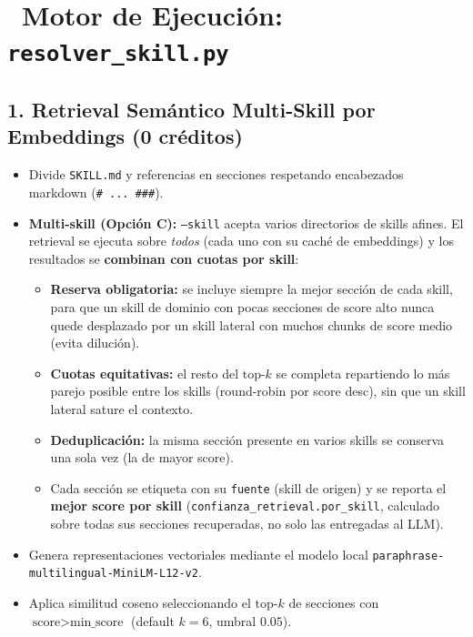 \documentclass[11pt,a4paper]{article}
\newcommand{\iconotexto}[2]{\textcolor{cyanNeon}{\faIcon{#1}}~#2}
\begin{document}
\section[Motor de Ejecución resolver\_skill.py]{\iconotexto{cogs}{Motor de Ejecución: \texttt{resolver\_skill.py}}}

\subsection{1. Retrieval Semántico Multi-Skill por Embeddings (0 créditos)}
\begin{itemize}[leftmargin=*]
  \item Divide \texttt{SKILL.md} y referencias en secciones respetando encabezados markdown (\texttt{\# ... \#\#\#}).
  \item \textbf{Multi-skill (Opción C):} \texttt{--skill} acepta varios directorios de skills afines. El retrieval se ejecuta sobre \emph{todos} (cada uno con su caché de embeddings) y los resultados se \textbf{combinan con cuotas por skill}:
  \begin{itemize}[leftmargin=*]
    \item \textbf{Reserva obligatoria:} se incluye siempre la mejor sección de cada skill, para que un skill de dominio con pocas secciones de score alto nunca quede desplazado por un skill lateral con muchos chunks de score medio (evita dilución).
    \item \textbf{Cuotas equitativas:} el resto del $\text{top-}k$ se completa repartiendo lo más parejo posible entre los skills (round-robin por score desc), sin que un skill lateral sature el contexto.
    \item \textbf{Deduplicación:} la misma sección presente en varios skills se conserva una sola vez (la de mayor score).
    \item Cada sección se etiqueta con su \texttt{fuente} (skill de origen) y se reporta el \textbf{mejor score por skill} (\texttt{confianza\_retrieval.por\_skill}, calculado sobre todas sus secciones recuperadas, no solo las entregadas al LLM).
  \end{itemize}
  \item Genera representaciones vectoriales mediante el modelo local \texttt{paraphrase-multilingual-MiniLM-L12-v2}.
  \item Aplica similitud coseno seleccionando el $\text{top-}k$ de secciones con $\text{score} > \text{min\_score}$ (default $k=6$, umbral $0.05$).

\end{itemize}
\end{document}
